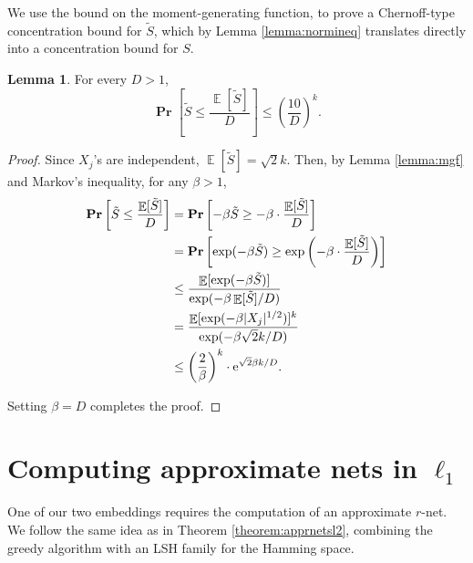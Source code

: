 \documentclass[10pt,a4paper,twoside]{book}
\newcommand{\ex}{{\rm e}}
\DeclareMathOperator*{\prob}{\mathbf{Pr}}
\DeclareMathOperator*{\EE}{\mathbb{E}}
\theoremstyle{definition}
\newtheorem{lemma}[definition]{Lemma}
\theoremstyle{remark}
\begin{document}
We use the bound on the moment-generating function, to prove a Chernoff-type concentration bound for $\tilde{S}$, which by Lemma \ref{lemma:normineq} translates directly into a concentration bound for $S$.

\begin{lemma} \label{conc-bound}
For every $D>1$,
\begin{equation*}
    \prob \left [ \tilde{S} \leq \frac{\EE [\tilde{S}]}{D}\right] \leq \left( \frac{10}{D}\right)^k.
\end{equation*}
\end{lemma}
\begin{proof}
Since $X_j$'s are independent, $\EE[\tilde{S}] = \sqrt{2}k$. Then, by Lemma \ref{lemma:mgf} and Markov's inequality, for any $\beta>1$,
\begin{align*}
    \prob \left [ \tilde{S} \leq \frac{\EE [\tilde{S}]}{D}\right] &= \prob \left[  -\beta \tilde{S} \geq  -\beta\cdot  \frac{\EE [\tilde{S}]}{D}\right] \\
    &= \prob \left[  \exp (-\beta \tilde{S}) \geq  \exp \left(-\beta\cdot  \frac{\EE [\tilde{S}]}{D}\right)\right] \\
    &\leq \frac{\EE [\exp (-\beta \tilde{S})]}{\exp (-\beta \EE [\tilde{S}]/D)} \\
    &= \frac{\EE [\exp (-\beta |X_j|^{1/2})]^k}{\exp (-\beta \sqrt{2}k/D)} \\
    &\leq \left(\frac{2}{\beta} \right)^k \cdot \ex^{\sqrt{2} \beta k/D}.
\end{align*}

Setting $\beta=D$ completes the proof. 
\end{proof}

\section{Computing approximate nets in \texorpdfstring{$\ell_1$}{l1}} \label{section:aprnets}
One of our two embeddings requires the computation of an approximate $r$-net. We follow the same idea as in Theorem \ref{theorem:apprnetsl2}, combining the greedy algorithm with an LSH family for the Hamming space.
\end{document}
